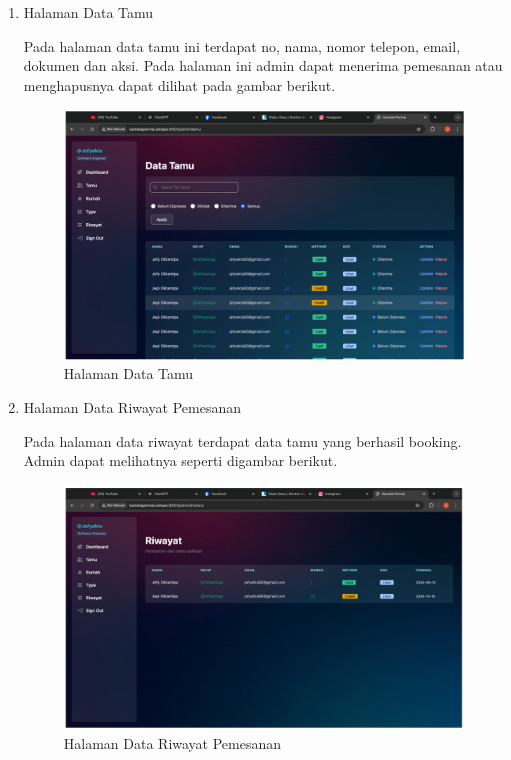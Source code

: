 \begin{enumerate}
    \item Halaman Data Tamu
    \par Pada halaman data tamu ini terdapat no, nama, nomor telepon, email, dokumen dan aksi. Pada halaman ini admin dapat menerima pemesanan atau menghapusnya dapat dilihat pada gambar berikut.
    \begin{figure}
        \centering
        \includegraphics[width=0.75\linewidth]{Implementasi/Data Tamu.png}
        \caption{Halaman Data Tamu}
    \end{figure}
    
    \item Halaman Data Riwayat Pemesanan
    \par Pada halaman data riwayat terdapat data tamu yang berhasil booking. Admin dapat melihatnya seperti digambar berikut.
    \begin{figure}
        \centering
        \includegraphics[width=0.75\linewidth]{Implementasi/Data Riwayat Pemesanan.png}
        \caption{Halaman Data Riwayat Pemesanan}
    \end{figure}
    

\end{enumerate}
